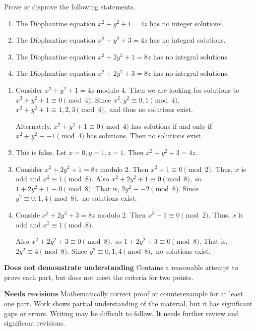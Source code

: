 \documentclass[letterpaper, 11pt]{ximera}
\begin{document}
\begin{ex}
	Prove or disprove the following statements.
	\begin{enumerate}[label=(\alph*)]
 		\item The Diophantine equation $x^2+y^2+1=4z$ has no integer solutions.
		\item The Diophantine equation $x^2+y^2+3=4z$  has no integral solutions.
		\item The Diophantine equation $x^2+2y^2+1=8z$  has no integral solutions.
		\item The Diophantine equation $x^2+2y^2+3=8z$  has no integral solutions.
	\end{enumerate}

	\begin{solution}
	\begin{enumerate}[label=(\alph*)]
		\item Consider $x^2+y^2+1=4z$ modulo $4$. Then we are looking for solutions to $x^2+y^2+1\equiv 0\pmod{4}$. Since $x^2,y^2\equiv 0,1\pmod{4},$ $x^2+y^2+1\equiv 1,2,3\pmod{4},$ and thus no solutions exist.
		
		Alternately, $x^2+y^2+1\equiv 0\pmod{4}$ has solutions if and only if $x^2+y^2\equiv -1\pmod{4}$ has solutions. Then no solutions exist.

		\item This is false. Let $x=0,y=1,z=1.$ Then $x^2+y^2+3=4z$.
		
		\item Consider $x^2+2y^2+1=8z$ modulo $2.$ Then $x^2+1\equiv 0\pmod{2}.$ Thus, $x$ is odd and $x^2\equiv 1\pmod{8}.$ Also $x^2+2y^2+1\equiv 0\pmod{8},$ so $1+2y^2+1\equiv 0\pmod{8}.$ That is, $2y^2\equiv -2\pmod{8}.$ Since $y^2\equiv 0,1,4\pmod{8},$ no solutions exist.
		
		\item Conside $x^2+2y^2+3=8z$ modulo $2.$ Then $x^2+1\equiv 0\pmod{2}.$ Thus, $x$ is odd and $x^2\equiv 1\pmod{8}.$ 
		
		Also $x^2+2y^2+3\equiv 0\pmod{8},$ so $1+2y^2+3\equiv 0\pmod{8}.$ That is, $2y^2\equiv 4\pmod{8}.$ Since $y^2\equiv 0,1,4\pmod{8},$ no solutions exist.
	\end{enumerate}
	\end{solution}

\begin{writeRubric}
    \item \textbf{Does not demonstrate understanding}
     Contains a reasonable attempt to prove each part, but does not meet the criteria for two points.
    \item \textbf{Needs revisions}
	Mathematically correct proof or counterexample for at least one part. Work shows partial understanding of the material, but it has significant gaps or errors. Writing may be difficult to follow. It needs further review and significant revisions.
     

\end{writeRubric}
\end{ex}
\end{document}
